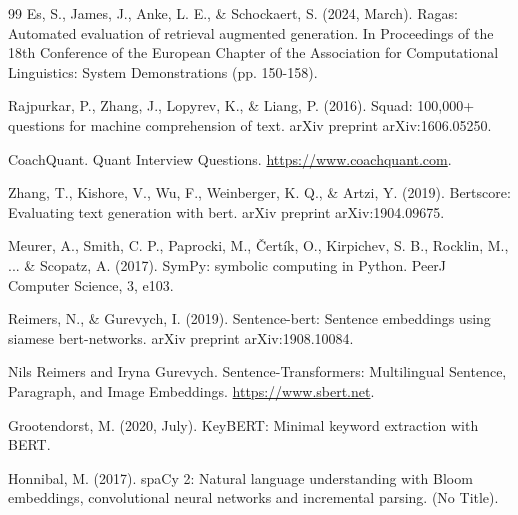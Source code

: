 \documentclass[12pt, a4paper]{article}
\begin{document}
\begin{thebibliography}{99}
Es, S., James, J., Anke, L. E., \& Schockaert, S. (2024, March). Ragas: Automated evaluation of retrieval augmented generation. In Proceedings of the 18th Conference of the European Chapter of the Association for Computational Linguistics: System Demonstrations (pp. 150-158).


Rajpurkar, P., Zhang, J., Lopyrev, K., \& Liang, P. (2016). Squad: 100,000+ questions for machine comprehension of text. arXiv preprint arXiv:1606.05250.

CoachQuant.
\newblock Quant Interview Questions.
\newblock \url{https://www.coachquant.com}.



Zhang, T., Kishore, V., Wu, F., Weinberger, K. Q., \& Artzi, Y. (2019). Bertscore: Evaluating text generation with bert. arXiv preprint arXiv:1904.09675.

Meurer, A., Smith, C. P., Paprocki, M., Čertík, O., Kirpichev, S. B., Rocklin, M., ... \& Scopatz, A. (2017). SymPy: symbolic computing in Python. PeerJ Computer Science, 3, e103.



Reimers, N., \& Gurevych, I. (2019). Sentence-bert: Sentence embeddings using siamese bert-networks. arXiv preprint arXiv:1908.10084.

Nils Reimers and Iryna Gurevych.
\newblock Sentence-Transformers: Multilingual Sentence, Paragraph, and Image Embeddings.
\newblock \url{https://www.sbert.net}.

Grootendorst, M. (2020, July). KeyBERT: Minimal keyword extraction with BERT.


Honnibal, M. (2017). spaCy 2: Natural language understanding with Bloom embeddings, convolutional neural networks and incremental parsing. (No Title).



\end{thebibliography}
\end{document}
